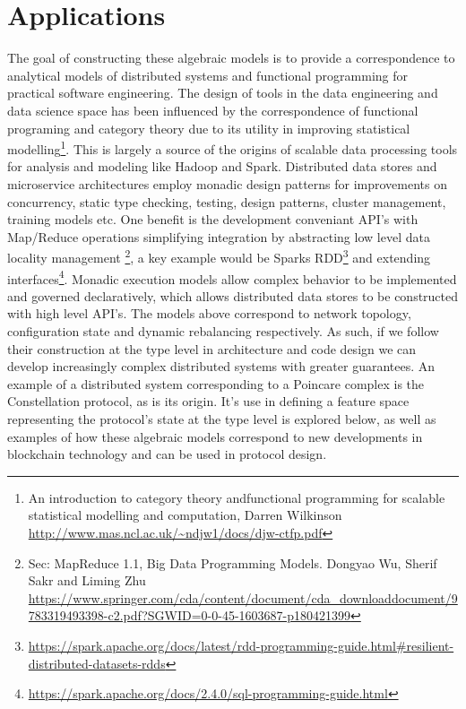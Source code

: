 \documentclass{article}
\begin{document}
\section{Applications} 
The goal of constructing these algebraic models is to provide a correspondence to analytical models of distributed systems and functional programming for practical software engineering. The design of tools in the data engineering and data science space has been influenced by the correspondence of functional programing and category theory due to its utility in improving statistical modelling\footnote{An introduction to category theory andfunctional programming for scalable statistical modelling and computation, Darren Wilkinson \url{http://www.mas.ncl.ac.uk/~ndjw1/docs/djw-ctfp.pdf}}. This is largely a source of the origins of scalable data processing tools for analysis and modeling like Hadoop and Spark. Distributed data stores and microservice architectures employ monadic design patterns for improvements on concurrency, static type checking, testing, design patterns, cluster management, training models etc. One benefit is the development conveniant API's with Map/Reduce operations simplifying integration by abstracting low level data locality management \footnote{Sec: MapReduce 1.1, Big Data Programming Models. Dongyao Wu, Sherif Sakr and Liming Zhu \url{https://www.springer.com/cda/content/document/cda_downloaddocument/9783319493398-c2.pdf?SGWID=0-0-45-1603687-p180421399}}, a key example would be Sparks RDD\footnote{\url{https://spark.apache.org/docs/latest/rdd-programming-guide.html#resilient-distributed-datasets-rdds}} and extending interfaces\footnote{\url{https://spark.apache.org/docs/2.4.0/sql-programming-guide.html}}. Monadic execution models allow complex behavior to be implemented and governed declaratively, which allows distributed data stores to be constructed with high level API's. The models above correspond to network topology, configuration state and dynamic rebalancing respectively. As such, if we follow their construction at the type level in architecture and code design we can develop increasingly complex distributed systems with greater guarantees. An example of a distributed system corresponding to a Poincare complex is the Constellation protocol, as is its origin. It's use in defining a feature space representing the protocol's state at the type level is explored below, as well as examples of how these algebraic models correspond to new developments in blockchain technology and can be used in protocol design.
\end{document}
